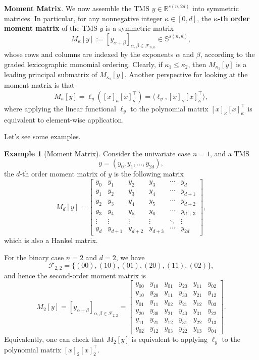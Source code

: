 \documentclass[
]{book}
\theoremstyle{definition}
\theoremstyle{definition}
\newtheorem{example}{Example}[chapter]
\theoremstyle{definition}
\theoremstyle{definition}
\theoremstyle{remark}
\begin{document}
\textbf{Moment Matrix}. We now assemble the TMS \(y \in \mathbb{R}^{s(n,2d)}\) into symmetric matrices. In particular, for any nonnegative integer \(\kappa \in [0,d]\), the \textbf{\(\kappa\)-th order moment matrix} of the TMS \(y\) is a symmetric matrix
\[
M_\kappa[y]:= [y_{\alpha + \beta}]_{\alpha,\beta \in \mathcal{F}_{n,\kappa}} \in \mathbb{S}^{s(n,\kappa)},
\]
whose rows and columns are indexed by the exponents \(\alpha\) and \(\beta\), according to the graded lexicographic monomial ordering. Clearly, if \(\kappa_1 \leq \kappa_2\), then \(M_{\kappa_1}[y]\) is a leading principal submatrix of \(M_{\kappa_2}[y]\). Another perspective for looking at the moment matrix is that
\[
M_{\kappa}[y] = \ell_y ([x]_{\kappa} [x]_{\kappa}^\top) = \langle \ell_y, [x]_{\kappa} [x]_{\kappa}^\top \rangle,
\]
where applying the linear functional \(\ell_y\) to the polynomial matrix \([x]_{\kappa} [x]_{\kappa}^\top\) is equivalent to element-wise application.

Let's see some examples.

\begin{example}[Moment Matrix]
\protect\hypertarget{exm:MomentMatrix}{}\label{exm:MomentMatrix}Consider the univariate case \(n=1\), and a TMS
\[
y = (y_0,y_1,\dots,y_{2d}),
\]
the \(d\)-th order moment matrix of \(y\) is the following matrix
\[
M_d[y] = \begin{bmatrix}
y_0 & y_1 & y_2 & y_3 & \cdots & y_d \\
y_1 & y_2 & y_3 & y_4 & \cdots & y_{d+1} \\
y_2 & y_3 & y_4 & y_5 & \cdots & y_{d+2} \\
y_3 & y_4 & y_5 & y_6 & \cdots & y_{d+3} \\
\vdots & \vdots & \vdots & \vdots & \ddots & \vdots \\
y_d & y_{d+1} & y_{d+2} & y_{d+3} & \cdots & y_{2d}
\end{bmatrix},
\]
which is also a Hankel matrix.

For the binary case \(n=2\) and \(d=2\), we have
\[
\mathcal{F}_{2,2} = \{ (00),(10),(01),(20),(11),(02) \},
\]
and hence the second-order moment matrix is
\[
M_2[y] = [y_{\alpha + \beta}]_{\alpha,\beta \in \mathcal{F}_{2,2}} = \begin{bmatrix}
y_{00} & y_{10} & y_{01} & y_{20} & y_{11} & y_{02} \\
y_{10} & y_{20} & y_{11} & y_{30} & y_{21} & y_{12} \\
y_{01} & y_{11} & y_{02} & y_{21} & y_{12} & y_{03} \\
y_{20} & y_{30} & y_{21} & y_{40} & y_{31} & y_{22} \\
y_{11} & y_{21} & y_{12} & y_{31} & y_{22} & y_{13} \\
y_{02} & y_{12} & y_{03} & y_{22} & y_{13} & y_{04}
\end{bmatrix}.
\]
Equivalently, one can check that \(M_2[y]\) is equivalent to applying \(\ell_y\) to the polynomial matrix \([x]_2 [x]_2^\top\).
\end{example}
\end{document}
